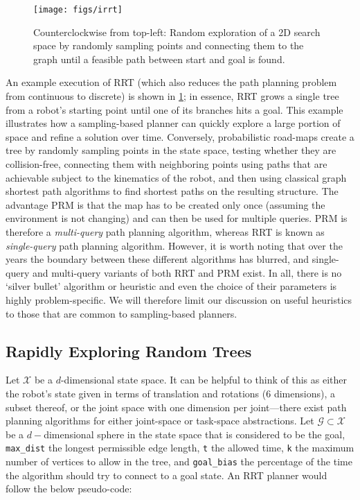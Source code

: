 \begin{figure}[!]
    \centering
    \texttt{[image: figs/irrt]}
    \caption{Counterclockwise from top-left: Random exploration of a 2D search space by randomly sampling points and connecting them to the graph until a feasible path between start and goal is found.\label{fig:rrt}}
\end{figure}

An example execution of RRT (which also reduces the path planning problem from continuous to discrete) is shown in \cref{fig:rrt}; in essence, RRT grows a single tree from a robot's starting point until one of its branches hits a goal.
This example illustrates how a sampling-based planner can quickly explore a large portion of space and refine a solution over time.
Conversely, probabilistic road-maps create a tree by randomly sampling points in the state space, testing whether they are collision-free, connecting them with neighboring points using paths that are achievable subject to the kinematics of the robot, and then using classical graph shortest path algorithms to find shortest paths on the resulting structure.
The advantage PRM is that the map has to be created only once (assuming the environment is not changing) and can then be used for multiple queries. PRM is therefore a \textsl{multi-query} path planning algorithm, whereas RRT is known as \textsl{single-query} path planning algorithm.
However, it is worth noting that over the years the boundary between these different algorithms has blurred, and single-query and multi-query variants of both RRT and PRM exist.
In all, there is no `silver bullet' algorithm or heuristic and even the choice of their parameters is highly problem-specific. We will therefore limit our discussion on useful heuristics to those that are common to sampling-based planners.

\subsection{Rapidly Exploring Random Trees}

Let $ \mathcal{X}$ be a $d$-dimensional state space. It can be helpful to think of this as either the robot's state given in terms of translation and rotations ($6$ dimensions), a subset thereof, or the joint space with one dimension per joint---there exist path planning algorithms for either joint-space or task-space abstractions. Let $ \mathcal{G} \subset \mathcal{X}$ be a $d-$dimensional sphere in the state space that is considered to be the goal, \texttt{max\_dist} the longest permissible edge length, \texttt{t} the allowed time, \texttt{k} the maximum number of vertices to allow in the tree, and \texttt{goal\_bias} the percentage of the time the algorithm should try to connect to a goal state. An RRT planner would follow the below pseudo-code:

